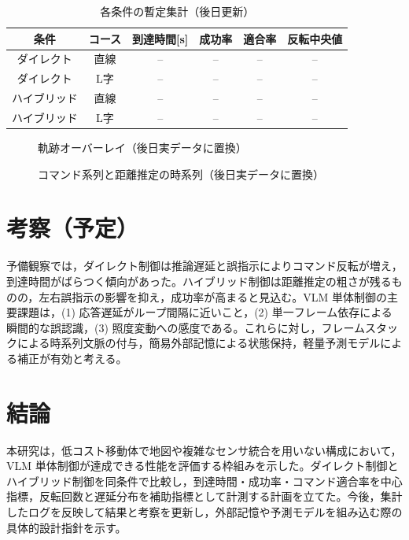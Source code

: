 \documentclass[a4paper,11pt]{ltjsreport}
\begin{document}
\begin{table}[htbp]
  \centering
  \caption{各条件の暫定集計（後日更新）}
  \label{tab:summary}
  \begin{tabular}{|c|c|c|c|c|c|}
    \hline
    条件 & コース & 到達時間[s] & 成功率 & 適合率 & 反転中央値 \\
    \hline
    ダイレクト & 直線 & -- & -- & -- & -- \\
    ダイレクト & L字 & -- & -- & -- & -- \\
    ハイブリッド & 直線 & -- & -- & -- & -- \\
    ハイブリッド & L字 & -- & -- & -- & -- \\
    \hline
  \end{tabular}
\end{table}

\begin{figure}[htbp]
  \centering
  \fbox{\rule{0.65\textwidth}{0.32\textwidth}}
  \caption{軌跡オーバーレイ（後日実データに置換）}
  \label{fig:trajectory1}
\end{figure}

\begin{figure}[htbp]
  \centering
  \fbox{\rule{0.65\textwidth}{0.32\textwidth}}
  \caption{コマンド系列と距離推定の時系列（後日実データに置換）}
  \label{fig:trajectory2}
\end{figure}

\chapter{考察（予定）}
\label{chap:discussion}
予備観察では，ダイレクト制御は推論遅延と誤指示によりコマンド反転が増え，到達時間がばらつく傾向があった。ハイブリッド制御は距離推定の粗さが残るものの，左右誤指示の影響を抑え，成功率が高まると見込む。VLM 単体制御の主要課題は，(1) 応答遅延がループ間隔に近いこと，(2) 単一フレーム依存による瞬間的な誤認識，(3) 照度変動への感度である。これらに対し，フレームスタックによる時系列文脈の付与，簡易外部記憶による状態保持，軽量予測モデルによる補正が有効と考える。

\chapter{結論}
\label{chap:conclusion}
本研究は，低コスト移動体で地図や複雑なセンサ統合を用いない構成において，VLM 単体制御が達成できる性能を評価する枠組みを示した。ダイレクト制御とハイブリッド制御を同条件で比較し，到達時間・成功率・コマンド適合率を中心指標，反転回数と遅延分布を補助指標として計測する計画を立てた。今後，集計したログを反映して結果と考察を更新し，外部記憶や予測モデルを組み込む際の具体的設計指針を示す。
\end{document}
